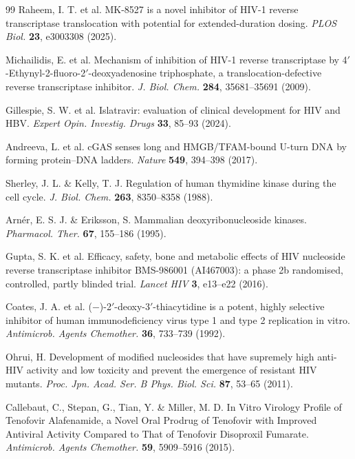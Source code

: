 \documentclass[11pt,twocolumn,twoside]{extarticle}
\begin{document}
\begin{thebibliography}{99}
 Raheem, I. T. et al. MK-8527 is a novel inhibitor of HIV-1 reverse transcriptase translocation with potential for extended-duration dosing. \textit{PLOS Biol.} \textbf{23}, e3003308 (2025).

 Michailidis, E. et al. Mechanism of inhibition of HIV-1 reverse transcriptase by 4$'$-Ethynyl-2-fluoro-2$'$-deoxyadenosine triphosphate, a translocation-defective reverse transcriptase inhibitor. \textit{J. Biol. Chem.} \textbf{284}, 35681--35691 (2009).

 Gillespie, S. W. et al. Islatravir: evaluation of clinical development for HIV and HBV. \textit{Expert Opin. Investig. Drugs} \textbf{33}, 85--93 (2024).

 Andreeva, L. et al. cGAS senses long and HMGB/TFAM-bound U-turn DNA by forming protein--DNA ladders. \textit{Nature} \textbf{549}, 394--398 (2017).

 Sherley, J. L. \& Kelly, T. J. Regulation of human thymidine kinase during the cell cycle. \textit{J. Biol. Chem.} \textbf{263}, 8350--8358 (1988).

 Arn\'er, E. S. J. \& Eriksson, S. Mammalian deoxyribonucleoside kinases. \textit{Pharmacol. Ther.} \textbf{67}, 155--186 (1995).

 Gupta, S. K. et al. Efficacy, safety, bone and metabolic effects of HIV nucleoside reverse transcriptase inhibitor BMS-986001 (AI467003): a phase 2b randomised, controlled, partly blinded trial. \textit{Lancet HIV} \textbf{3}, e13--e22 (2016).

 Coates, J. A. et al. ($-$)-2$'$-deoxy-3$'$-thiacytidine is a potent, highly selective inhibitor of human immunodeficiency virus type 1 and type 2 replication in vitro. \textit{Antimicrob. Agents Chemother.} \textbf{36}, 733--739 (1992).

 Ohrui, H. Development of modified nucleosides that have supremely high anti-HIV activity and low toxicity and prevent the emergence of resistant HIV mutants. \textit{Proc. Jpn. Acad. Ser. B Phys. Biol. Sci.} \textbf{87}, 53--65 (2011).

 Callebaut, C., Stepan, G., Tian, Y. \& Miller, M. D. In Vitro Virology Profile of Tenofovir Alafenamide, a Novel Oral Prodrug of Tenofovir with Improved Antiviral Activity Compared to That of Tenofovir Disoproxil Fumarate. \textit{Antimicrob. Agents Chemother.} \textbf{59}, 5909--5916 (2015).


\end{thebibliography}
\end{document}
